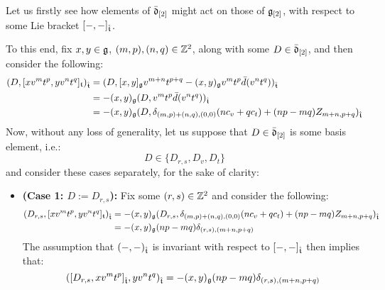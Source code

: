            \begin{remark} \label{remark: derivation_action_on_loop_algebras}
                Let us firstly see how elements of $\bar{\mathfrak{d}}_{[2]}$ might act on those of $\mathfrak{g}_{[2]}$, with respect to some Lie bracket $[-, -]_{\hat{\mathfrak{t}}}$. 

                To this end, fix $x, y \in \mathfrak{g}$, $(m, p), (n, q) \in \mathbb{Z}^2$, along with some $D \in \bar{\mathfrak{d}}_{[2]}$, and then consider the following:
                    $$
                        \begin{aligned}
                            ( D, [x v^m t^p, y v^n t^q]_{\mathfrak{t}} )_{\hat{\mathfrak{t}}} & = ( D, [x, y]_{\mathfrak{g}} v^{m + n} t^{p + q} - (x, y)_{\mathfrak{g}} v^m t^p \bar{d}( v^n t^q ) )_{\hat{\mathfrak{t}}}
                            \\
                            & = -(x, y)_{\mathfrak{g}} ( D, v^m t^p \bar{d}( v^n t^q ) )_{\hat{\mathfrak{t}}}
                            \\
                            & = -(x, y)_{\mathfrak{g}} ( D, \delta_{(m, p) + (n, q), (0, 0)} ( n c_v + q c_t ) + (np - mq) Z_{m + n, p + q} )_{\hat{\mathfrak{t}}}
                        \end{aligned}
                    $$
                Now, without any loss of generality, let us suppose that $D \in \bar{\mathfrak{d}}_{[2]}$ is some basis element, i.e.:
                    $$D \in \{ D_{r, s}, D_v, D_t \}$$
                and consider these cases separately, for the sake of clarity:
                \begin{itemize}
                    \item \textbf{(Case 1: $D := D_{r, s}$):} Fix some $(r, s) \in \mathbb{Z}^2$ and consider the following:
                        $$
                            \begin{aligned}
                                ( D_{r, s}, [x v^m t^p, y v^n t^q]_{\mathfrak{t}} )_{\hat{\mathfrak{t}}} & = -(x, y)_{\mathfrak{g}} ( D_{r, s}, \delta_{(m, p) + (n, q), (0, 0)} ( n c_v + q c_t ) + (np - mq) Z_{m + n, p + q} )_{\hat{\mathfrak{t}}}
                                \\
                                & = -(x, y)_{\mathfrak{g}} (np - mq) \delta_{(r, s), (m + n, p + q)}
                            \end{aligned}
                        $$
                    The assumption that $(-, -)_{\hat{\mathfrak{t}}}$ is invariant with respect to $[-, -]_{\hat{\mathfrak{t}}}$ then implies that:
                        $$( [D_{r, s}, x v^m t^p]_{\hat{\mathfrak{t}}}, y v^n t^q )_{\hat{\mathfrak{t}}} = -(x, y)_{\mathfrak{g}} (np - mq) \delta_{(r, s), (m + n, p + q)}$$

\end{itemize}
\end{remark}
